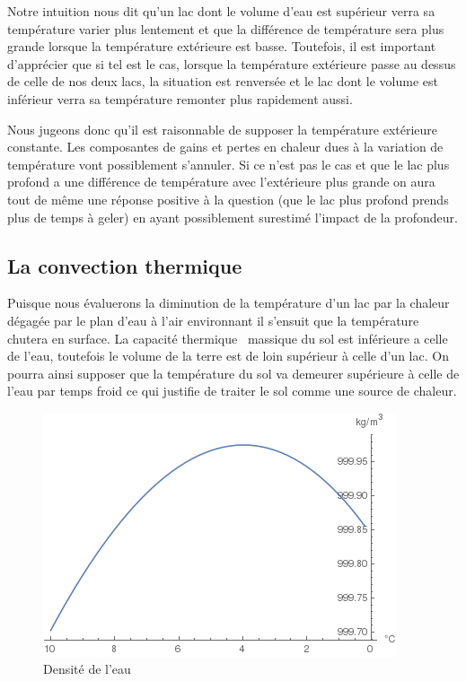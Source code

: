 \documentclass[12pt]{article}
\numberwithin{figure}{section}
\begin{document}
Notre intuition nous dit qu'un lac dont le volume d'eau est sup\'erieur verra sa temp\'erature
varier plus lentement et que la diff\'erence de temp\'erature sera plus grande lorsque la
temp\'erature ext\'erieure est basse. Toutefois, il est important d'appr\'ecier que si tel est le
cas, lorsque la temp\'erature ext\'erieure passe au dessus de celle de nos deux lacs, la situation
est renvers\'ee et le lac dont le volume est inf\'erieur verra sa temp\'erature remonter plus
rapidement aussi.

Nous jugeons donc qu'il est raisonnable de supposer la temp\'erature ext\'erieure constante. Les
composantes de gains et pertes en chaleur dues \`a la variation de temp\'erature vont possiblement
s'annuler. Si ce n'est pas le cas et que le lac plus profond a une diff\'erence de temp\'erature
avec l'ext\'erieure plus grande on aura tout de m\^eme une r\'eponse positive \`a la question (que
le lac plus profond prends plus de temps \`a geler) en ayant possiblement surestim\'e l'impact de
la profondeur.

\subsection{La convection thermique}\label{Convec}

Puisque nous \'evaluerons la diminution de la temp\'erature d'un lac par la chaleur d\'egag\'ee par
le plan d'eau \`a l'air environnant il s'ensuit que la temp\'erature chutera en surface. La
capacit\'e thermique~\cite{CapTherm} massique du sol est inf\'erieure a celle de l'eau, toutefois le
volume de la terre est de loin sup\'erieur \`a celle d'un lac. On pourra ainsi supposer que la
temp\'erature du sol va demeurer sup\'erieure \`a celle de l'eau par temps froid ce qui justifie de
traiter le sol comme une source de chaleur.

\begin{figure}[h]\label{water-density}
    \centering
    \includegraphics[scale=0.7]{WaterDensity.png}
    \caption{Densit\'e de l'eau}
\end{figure}
\end{document}
